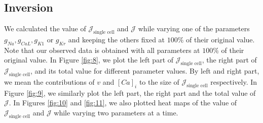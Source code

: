 \documentclass[12pt,a4paper]{article}
\begin{document}
\subsection{Inversion} \label{Inversion}
We calculated the value of $\mathcal{J}_{\text{single cell}}$ and $\mathcal{J}$ while varying one of the parameters $g_{Na}, g_{CaL}, g_{K1}$ or $g_{Kr}$ and keeping the others fixed at $100\%$ of their original value. Note that our observed data is obtained with all parameters at $100\%$ of their original value. In Figure \ref{fig:8}, we plot the left part of $\mathcal{J}_{\text{single cell}}$, the right part of $\mathcal{J}_{\text{single cell}}$, and its total value for different parameter values. By left and right part, we mean the contributions of $v$ and $[Ca]_i$ to the size of $\mathcal{J}_{\text{single cell}}$ respectively. In Figure \ref{fig:9}, we similarly plot the left part, the right part and the total value of $\mathcal{J}$. In Figures \ref{fig:10} and \ref{fig:11}, we also plotted heat maps of the value of $\mathcal{J}_{\text{single cell}}$ and $\mathcal{J}$ while varying two parameters at a time.
\end{document}
